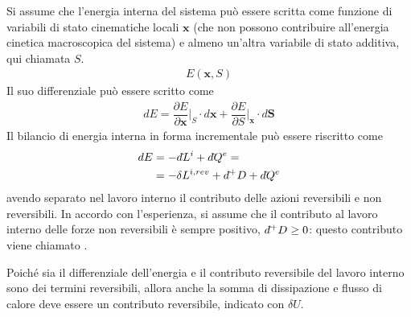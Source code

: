 \documentclass[letterpaper,10pt,english]{jupyterBook}
\begin{document}
\sphinxAtStartPar
Si assume che l’energia interna del sistema può essere scritta come funzione di variabili di stato cinematiche locali \(\mathbf{x}\) (che non possono contribuire all’energia cinetica macroscopica del sistema) e almeno un’altra variabile di stato additiva, qui chiamata \(S\).
\begin{equation*}
\begin{split}E(\mathbf{x}, S)\end{split}
\end{equation*}
\sphinxAtStartPar
Il suo differenziale può essere scritto come
\begin{equation*}
\begin{split}d E = \dfrac{\partial E}{\partial \mathbf{x}}\Big|_{S} \cdot d \mathbf{x} + \dfrac{\partial E}{\partial S}\Big|_{\mathbf{x}} \cdot d \mathbf{S}\end{split}
\end{equation*}
\sphinxAtStartPar
Il bilancio di energia interna in forma incrementale può essere riscritto come
\begin{equation*}
\begin{split}\begin{aligned}
d E & = - d\hspace{-0.08pt}\bar{}\hspace{0.1pt} L^i + d\hspace{-0.08pt}\bar{}\hspace{0.1pt} Q^e =  \\
    & = - \delta L^{i,rev} + d\hspace{-0.08pt}\bar{}\hspace{0.1pt}^+ D + d\hspace{-0.08pt}\bar{}\hspace{0.1pt} Q^e  \\
\end{aligned}\end{split}
\end{equation*}
\sphinxAtStartPar
avendo separato nel lavoro interno il contributo delle azioni reversibili e non reversibili. In accordo con l’esperienza, si assume che il contributo al lavoro interno delle forze non reversibili è sempre positivo, \(d\hspace{-0.08pt}\bar{}\hspace{0.1pt}^+ D \ge 0\): questo contributo viene chiamato .

\sphinxAtStartPar
Poiché sia il differenziale dell’energia e il contributo reversibile del lavoro interno sono dei termini reversibili, allora anche la somma di dissipazione e flusso di calore deve essere un contributo reversibile, indicato con \(\delta U\).
\end{document}
